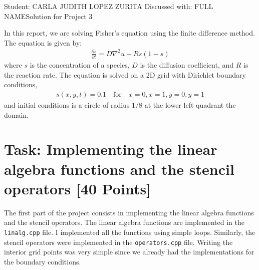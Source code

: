 \documentclass[unicode,11pt,a4paper,oneside,numbers=endperiod,openany]{scrartcl}
\begin{document}
\setassignment
{}

            {Student: CARLA JUDITH LOPEZ ZURITA}
            {Discussed with: FULL NAME}{Solution for Project 3}{}
\newline

\assignmentpolicy

In this report, we are solving Fisher's equation using the finite difference
method. The equation is given by:
\begin{align}
    \frac{\partial s}{\partial t} = D \nabla^2 u + R s (1 - s)
\end{align}
where $s$ is the concentration of a species, $D$ is the diffusion coefficient,
and $R$ is the reaction rate. The equation is solved on a 2D grid with
Dirichlet boundary conditions,
\begin{align}
    s(x, y, t) = 0.1 \quad \text{for} \quad x = 0, x = 1, y = 0, y = 1
\end{align}
and initial conditions is a circle of radius $1/8$ at the lower left quadrant the domain.
\section{Task: Implementing the linear algebra functions and the stencil
         operators [40 Points]}

The first part of the project consists in implementing the linear algebra functions and
the stencil operators. The linear algebra functions are implemented in the
\texttt{linalg.cpp} file. I implemented all the functions using
simple loops.
Similarly, the stencil operators were implemented in the
\texttt{operators.cpp} file. Writing the interior grid points was very simple since
we already had the implementations for the boundary conditions.
\end{document}
